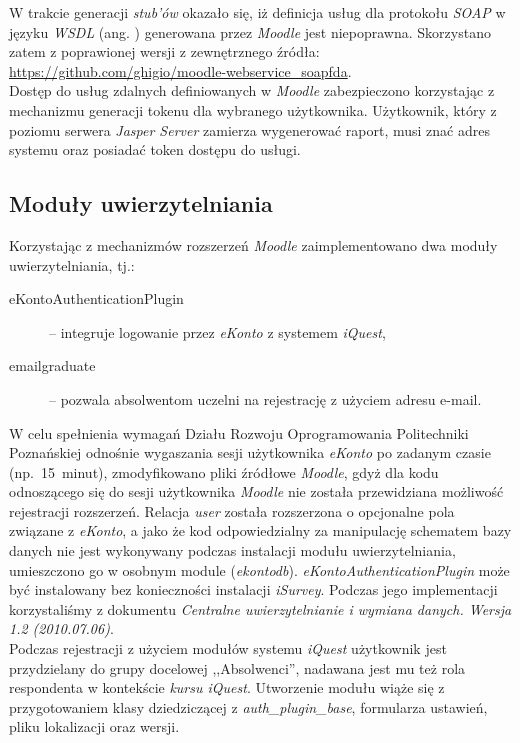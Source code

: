 W trakcie generacji \textit{stub'ów} okazało się, iż definicja usług dla protokołu \textit{SOAP} w języku \textit{WSDL} (ang. ) generowana przez \textit{Moodle} jest niepoprawna. Skorzystano zatem z poprawionej wersji z zewnętrznego źródła: \url{https://github.com/ghigio/moodle-webservice_soapfda}. \\

Dostęp do usług zdalnych definiowanych w \textit{Moodle} zabezpieczono korzystając z mechanizmu generacji tokenu dla wybranego użytkownika. Użytkownik, który z poziomu serwera \textit{Jasper Server} zamierza wygenerować raport, musi znać adres systemu oraz posiadać token dostępu do usługi.

\subsection{Moduły uwierzytelniania}
Korzystając z mechanizmów rozszerzeń \textit{Moodle} zaimplementowano dwa moduły uwierzytelniania, tj.:

\begin{description}
\item[eKontoAuthenticationPlugin] -- integruje logowanie przez \textit{eKonto} z systemem \textit{iQuest},
\item[emailgraduate] -- pozwala absolwentom uczelni na rejestrację z użyciem adresu e-mail.
\end{description}

W celu spełnienia wymagań Działu Rozwoju Oprogramowania Politechniki Poznańskiej odnośnie wygaszania sesji użytkownika \textit{eKonto} po zadanym czasie (np.~15~minut), zmodyfikowano pliki źródłowe \textit{Moodle}, gdyż dla kodu odnoszącego się do sesji użytkownika \textit{Moodle} nie została przewidziana możliwość rejestracji rozszerzeń. Relacja \textit{user} została rozszerzona o opcjonalne pola związane z \textit{eKonto}, a jako że kod odpowiedzialny za manipulację schematem bazy danych nie jest wykonywany podczas instalacji modułu uwierzytelniania, umieszczono go w osobnym module (\textit{ekontodb}). \textit{eKontoAuthenticationPlugin} może być instalowany bez konieczności instalacji \textit{iSurvey}. Podczas jego implementacji korzystaliśmy z dokumentu \textit{Centralne uwierzytelnianie i wymiana danych. Wersja 1.2 (2010.07.06)}\cite{PP:CUiWD10}. \\

Podczas rejestracji z użyciem modułów systemu \textit{iQuest} użytkownik jest przydzielany do grupy docelowej ,,Absolwenci'', nadawana jest mu też rola respondenta w kontekście \textit{kursu iQuest}. Utworzenie modułu wiąże się z przygotowaniem klasy dziedziczącej z \textit{auth\_plugin\_base}, formularza ustawień, pliku lokalizacji oraz wersji.


